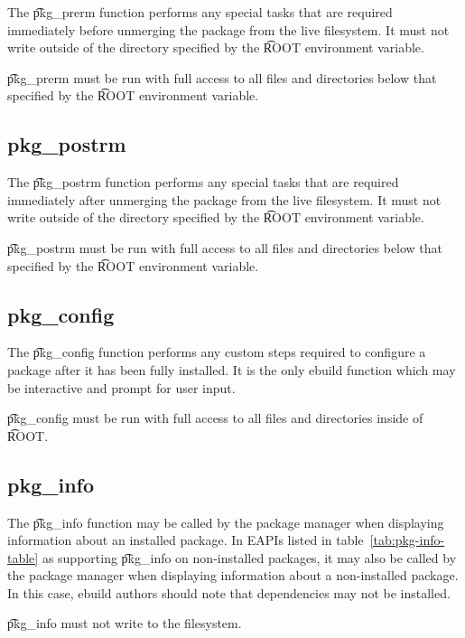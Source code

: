 The \t{pkg\_prerm} function performs any special tasks that are required immediately before
unmerging the package from the live filesystem. It must not write outside of the directory specified
by the \t{ROOT} environment variable.

\t{pkg\_prerm} must be run with full access to all files and directories below that specified by
the \t{ROOT} environment variable.

\subsection{pkg\_postrm}
\label{sec:pkg-postrm-function}

The \t{pkg\_postrm} function performs any special tasks that are required immediately after
unmerging the package from the live filesystem. It must not write outside of the directory specified
by the \t{ROOT} environment variable.

\t{pkg\_postrm} must be run with full access to all files and directories below that specified by
the \t{ROOT} environment variable.

\subsection{pkg\_config}
\label{sec:pkg-config-function}

The \t{pkg\_config} function performs any custom steps required to configure a package after it has been
fully installed. It is the only ebuild function which may be interactive and prompt for user input.

\t{pkg\_config} must be run with full access to all files and directories inside of \t{ROOT}.

\subsection{pkg\_info}
\label{sec:pkg-info-function}

 The \t{pkg\_info} function may be called by the package manager when
displaying information about an installed package. In EAPIs listed in table~\ref{tab:pkg-info-table}
as supporting \t{pkg\_info} on non-installed packages, it may also be called by the package manager
when displaying information about a non-installed package. In this case, ebuild authors should note
that dependencies may not be installed.

\t{pkg\_info} must not write to the filesystem.


